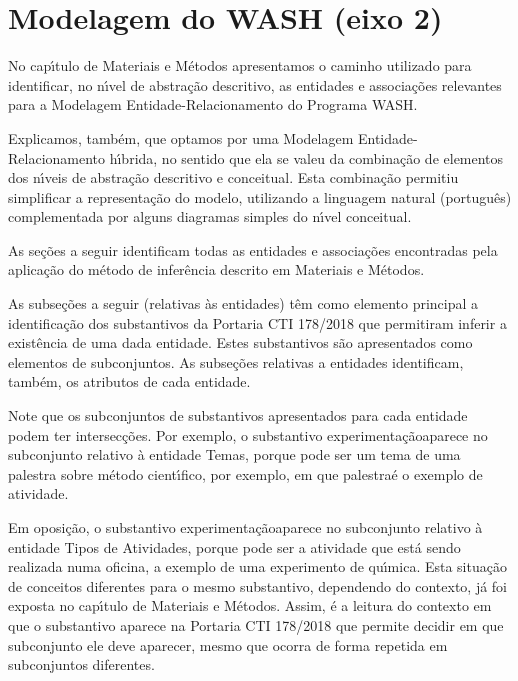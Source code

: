 \documentclass[
12pt,		%
openright,	%
twoside,  %
a4paper,			%
chapter=TITLE,		%
english,			%
french,				%
spanish,			%
brazil				%
]{USPSC-classe/USPSC}
\begin{document}
\section[Modelagem do WASH (eixo 2)]{Modelagem do WASH (eixo 2)}\label{Modelagem do WASH (eixo 2)}
No cap\'{\i}tulo de Materiais e M\'etodos apresentamos o caminho utilizado para identificar, no n\'{\i}vel de abstra\c{c}\~ao descritivo, as entidades e associa\c{c}\~oes relevantes para a Modelagem Entidade-Relacionamento do Programa WASH.




Explicamos, tamb\'em, que optamos por uma Modelagem Entidade-Relacionamento h\'{\i}brida, no sentido que ela se valeu da combina\c{c}\~ao de elementos dos n\'{\i}veis de abstra\c{c}\~ao descritivo e conceitual. Esta combina\c{c}\~ao permitiu simplificar a representa\c{c}\~ao do modelo, utilizando a linguagem natural (portugu\^es) complementada por alguns diagramas simples do n\'{\i}vel conceitual.




As se\c{c}\~oes a seguir identificam todas as entidades e associa\c{c}\~oes encontradas pela aplica\c{c}\~ao do m\'etodo de infer\^encia descrito em Materiais e M\'etodos.




As subse\c{c}\~oes a seguir (relativas \`as entidades) t\^em como elemento principal a identifica\c{c}\~ao dos substantivos da Portaria CTI 178/2018 que permitiram inferir a exist\^encia de uma dada entidade. Estes substantivos s\~ao apresentados como elementos de subconjuntos. As subse\c{c}\~oes relativas a entidades identificam, tamb\'em, os atributos de cada entidade.




Note que os subconjuntos de substantivos apresentados para cada entidade podem ter intersec\c{c}\~oes. Por exemplo, o substantivo \textquotedbl experimenta\c{c}\~ao\textquotedbl  aparece no subconjunto relativo \`a entidade \textquotedbl Temas\textquotedbl , porque pode ser um tema de uma palestra sobre m\'etodo cient\'{\i}fico, por exemplo, em que \textquotedbl palestra\textquotedbl  \'e o exemplo de atividade.




Em oposi\c{c}\~ao, o substantivo \textquotedbl experimenta\c{c}\~ao\textquotedbl  aparece no subconjunto relativo \`a entidade \textquotedbl Tipos de Atividades\textquotedbl , porque pode ser a atividade que est\'a sendo realizada numa oficina, a exemplo de uma experimento de qu\'{\i}mica. Esta situa\c{c}\~ao de conceitos diferentes para o mesmo substantivo, dependendo do contexto, j\'a foi exposta no cap\'{\i}tulo de Materiais e M\'etodos. Assim, \'e a leitura do contexto em que o substantivo aparece na Portaria CTI 178/2018 que permite decidir em que subconjunto ele deve aparecer, mesmo que ocorra de forma repetida em subconjuntos diferentes.
\end{document}
